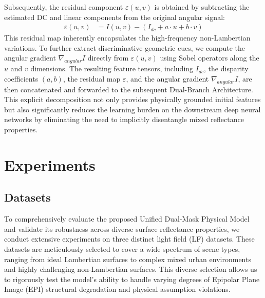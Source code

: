 \documentclass[lettersize,journal]{IEEEtran}
\begin{document}
Subsequently, the residual component $\varepsilon(u,v)$ is obtained by subtracting the estimated DC and linear components from the original angular signal:
\begin{equation}
\begin{aligned}
\varepsilon(u,v) &= I(u,v) - \left( I_{dc} + a \cdot u + b \cdot v \right)
\end{aligned}
\end{equation}
This residual map inherently encapsulates the high-frequency non-Lambertian variations. To further extract discriminative geometric cues, we compute the angular gradient $\nabla_{angular} I$ directly from $\varepsilon(u,v)$ using Sobel operators along the $u$ and $v$ dimensions. The resulting feature tensors, including $I_{dc}$, the disparity coefficients $(a, b)$, the residual map $\varepsilon$, and the angular gradient $\nabla_{angular} I$, are then concatenated and forwarded to the subsequent Dual-Branch Architecture. This explicit decomposition not only provides physically grounded initial features but also significantly reduces the learning burden on the downstream deep neural networks by eliminating the need to implicitly disentangle mixed reflectance properties.

\section{Experiments}

\subsection{Datasets}

To comprehensively evaluate the proposed Unified Dual-Mask Physical Model and validate its robustness across diverse surface reflectance properties, we conduct extensive experiments on three distinct light field (LF) datasets. These datasets are meticulously selected to cover a wide spectrum of scene types, ranging from ideal Lambertian surfaces to complex mixed urban environments and highly challenging non-Lambertian surfaces. This diverse selection allows us to rigorously test the model's ability to handle varying degrees of Epipolar Plane Image (EPI) structural degradation and physical assumption violations.
\end{document}

